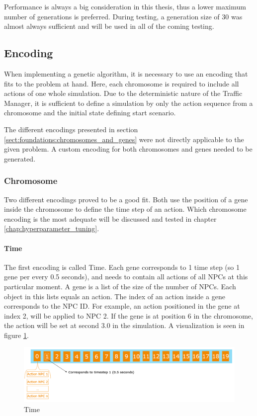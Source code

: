 Performance is always a big consideration in this thesis, thus a lower maximum number of generations is preferred. During testing, a generation size of 30 was almost always sufficient and will be used in all of the coming testing.

\subsection{Encoding}
When implementing a genetic algorithm, it is necessary to use an encoding that fits to the problem at hand. 
Here, each chromosome is required to include all actions of one whole simulation. Due to the deterministic nature of the Traffic Manager, it is sufficient to define a simulation by only the action sequence from a chromosome and the initial state defining start scenario.

The different encodings presented in section \ref{sect:foundations:chromosomes_and_genes} were not directly applicable to the given problem. A custom encoding for both chromosomes and genes needed to be generated.

\subsubsection{Chromosome}
Two different encodings proved to be a good fit. Both use the position of a gene inside the chromosome to define the time step of an action. Which chromosome encoding is the most adequate will be discussed and tested in chapter \ref{chap:hyperparameter_tuning}.

\paragraph{Time}
The first encoding is called Time. Each gene corresponds to 1 time step (so 1 gene per every 0.5 seconds), and needs to contain all actions of all NPCs at this particular moment. A gene is a list of the size of the number of NPCs. Each object in this lists equals an action. The index of an action inside a gene corresponds to the NPC ID. For example, an action positioned in the gene at index 2, will be applied to NPC 2. If the gene is at position 6 in the chromosome, the action will be set at second 3.0 in the simulation. A visualization is seen in figure \ref{fig:implementation:encoding_chromosome_time}.

\begin{figure}[ht] 
	\includegraphics[width=1\linewidth]{figures/time_encoding}
	\caption{Time}
	\label{fig:implementation:encoding_chromosome_time}
\end{figure}


